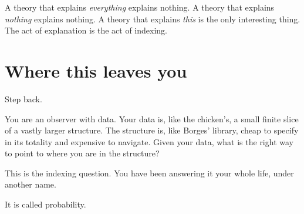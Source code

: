 A theory that explains \emph{everything} explains nothing. A theory that explains \emph{nothing} explains nothing. A theory that explains \emph{this} is the only interesting thing. The act of explanation is the act of indexing.

\section*{Where this leaves you}

Step back.

You are an observer with data. Your data is, like the chicken's, a small finite slice of a vastly larger structure. The structure is, like Borges' library, cheap to specify in its totality and expensive to navigate. Given your data, what is the right way to point to where you are in the structure?

This is the indexing question. You have been answering it your whole life, under another name.

It is called probability.
